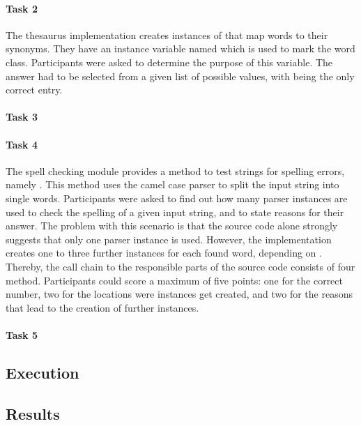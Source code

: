 \paragraph{Task 2} The thesaurus implementation creates instances of  that map words to their synonyms.
They have an instance variable named  which is used to mark the word class.
Participants were asked to determine the purpose of this variable.
The answer had to be selected from a given list of possible values, with  being the only correct entry.

\paragraph{Task 3}

\paragraph{Task 4} The spell checking module provides a method to test strings for spelling errors, namely .
This method uses the camel case parser to split the input string into single words.
Participants were asked to find out how many parser instances are used to check the spelling of a given input string, and to state reasons for their answer.
The problem with this scenario is that the source code alone strongly suggests that only one parser instance is used.
However, the implementation creates one to three further instances for each found word, depending on .
Thereby, the call chain to the responsible parts of the source code consists of four method.
Participants could score a maximum of five points: one for the correct number, two for the locations were instances get created, and two for the reasons that lead to the creation of further instances.

\paragraph{Task 5}


\subsection{Execution}
\label{ss:DiscussionEvaluationExecution}

\subsection{Results}
\label{ss:DiscussionEvaluationResults}

